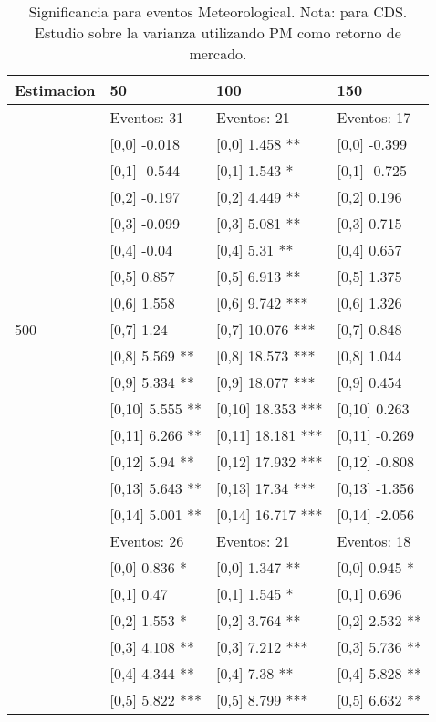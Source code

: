 \begin{table}

\caption{Significancia para eventos Meteorological. Nota: para CDS. Estudio sobre la varianza utilizando PM como retorno de mercado.}
\centering
\begin{tabular}[t]{llll}
\toprule
Estimacion & 50 & 100 & 150\\
\midrule
 & Eventos:  31 & Eventos:  21 & Eventos:  17\\
 & {}[0,0] -0.018 & {}[0,0] 1.458 ** & {}[0,0] -0.399\\
 & {}[0,1] -0.544 & {}[0,1] 1.543 * & {}[0,1] -0.725\\
 & {}[0,2] -0.197 & {}[0,2] 4.449 ** & {}[0,2] 0.196\\
 & {}[0,3] -0.099 & {}[0,3] 5.081 ** & {}[0,3] 0.715\\
\addlinespace
 & {}[0,4] -0.04 & {}[0,4] 5.31 ** & {}[0,4] 0.657\\
 & {}[0,5] 0.857 & {}[0,5] 6.913 ** & {}[0,5] 1.375\\
 & {}[0,6] 1.558 & {}[0,6] 9.742 *** & {}[0,6] 1.326\\
500 & {}[0,7] 1.24 & {}[0,7] 10.076 *** & {}[0,7] 0.848\\
 & {}[0,8] 5.569 ** & {}[0,8] 18.573 *** & {}[0,8] 1.044\\
\addlinespace
 & {}[0,9] 5.334 ** & {}[0,9] 18.077 *** & {}[0,9] 0.454\\
 & {}[0,10] 5.555 ** & {}[0,10] 18.353 *** & {}[0,10] 0.263\\
 & {}[0,11] 6.266 ** & {}[0,11] 18.181 *** & {}[0,11] -0.269\\
 & {}[0,12] 5.94 ** & {}[0,12] 17.932 *** & {}[0,12] -0.808\\
 & {}[0,13] 5.643 ** & {}[0,13] 17.34 *** & {}[0,13] -1.356\\
\addlinespace
 & {}[0,14] 5.001 ** & {}[0,14] 16.717 *** & {}[0,14] -2.056\\
 & Eventos:  26 & Eventos:  21 & Eventos:  18\\
 & {}[0,0] 0.836 * & {}[0,0] 1.347 ** & {}[0,0] 0.945 *\\
 & {}[0,1] 0.47 & {}[0,1] 1.545 * & {}[0,1] 0.696\\
 & {}[0,2] 1.553 * & {}[0,2] 3.764 ** & {}[0,2] 2.532 **\\
\addlinespace
 & {}[0,3] 4.108 ** & {}[0,3] 7.212 *** & {}[0,3] 5.736 **\\
 & {}[0,4] 4.344 ** & {}[0,4] 7.38 ** & {}[0,4] 5.828 **\\
 & {}[0,5] 5.822 *** & {}[0,5] 8.799 *** & {}[0,5] 6.632 **\\

\end{tabular}
\end{table}
